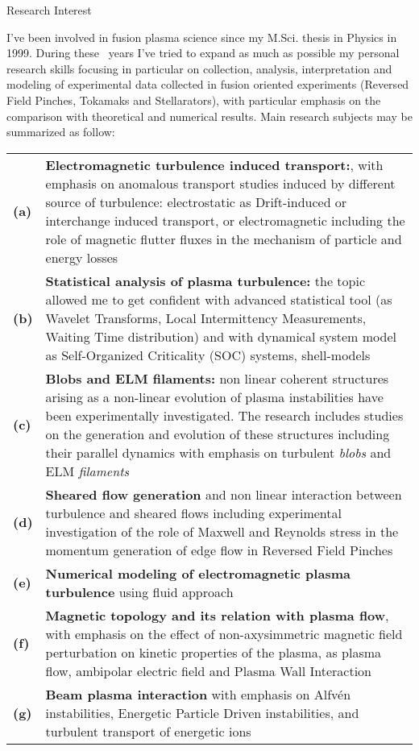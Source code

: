 {\begin{cvblock}{Research Interest}
  \end{cvblock}
I've been involved in fusion plasma science since my M.Sci. thesis in
Physics in 1999. During these \FPtrunc{}\mydegree\ years I've tried to expand as much as
possible my personal research skills focusing in particular on collection, analysis, interpretation and modeling of experimental data
collected in fusion oriented experiments (Reversed Field Pinches,
Tokamaks and Stellarators), with particular emphasis on the comparison
with theoretical and numerical results. Main research subjects may be summarized as follow: 
\setlength\LTleft{0.75in}
\setlength\LTright{1in}
\begin{longtable}{@{}>{\bfseries} p{} p{}@{}}
(a) & \textbf{Electromagnetic turbulence induced transport:}, with
emphasis on anomalous transport studies induced by different source of
turbulence: electrostatic as Drift-induced or interchange induced
transport, or electromagnetic including the role of magnetic flutter fluxes
in the mechanism of particle and energy losses\\
(b) & \textbf{Statistical analysis of plasma turbulence:} the topic
allowed me to get confident with advanced statistical tool (as Wavelet Transforms, Local Intermittency
  Measurements, Waiting Time distribution) and with dynamical system
  model as Self-Organized Criticality (SOC) systems, shell-models  \\
(c) & \textbf{Blobs and ELM filaments:} non linear coherent structures
arising as a non-linear evolution of plasma
instabilities have been experimentally investigated. The research
includes studies on the generation and evolution of these
structures including
their parallel dynamics with emphasis on turbulent \emph{blobs} and
ELM \emph{filaments}  \\
(d) & \textbf{Sheared flow generation} and non linear interaction
between turbulence and sheared flows including experimental
investigation of the role of Maxwell and Reynolds stress in the
momentum generation of edge flow in Reversed Field Pinches  \\
(e) & \textbf{Numerical modeling of electromagnetic plasma turbulence}
  using fluid approach \\
(f) & \textbf{Magnetic topology and its relation with plasma flow}, with
emphasis on the effect of non-axysimmetric magnetic field perturbation on kinetic
properties of the plasma, as plasma flow, ambipolar electric field and
Plasma Wall Interaction\\
(g) & \textbf{Beam plasma interaction} with emphasis on Alfv\'en instabilities,
Energetic Particle Driven instabilities, and turbulent transport of
energetic ions
\end{longtable}

}
